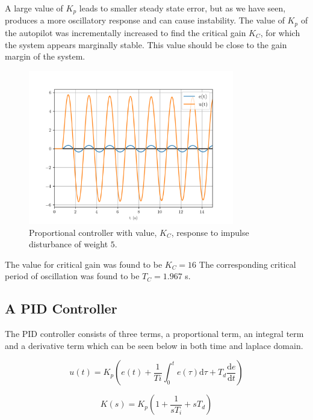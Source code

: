 \documentclass[8pt]{article}
\begin{document}
A large value of $K_p$ leads to smaller steady state error, but as we have seen, produces a more oscillatory response and can cause instability.
The value of $K_p$ of the autopilot was incrementally increased to find the critical gain $K_C$, for which the system appears marginally stable. This value should be close to the gain margin of the system.

\begin{figure}[H]
    \centering
    \includegraphics[width=0.8\textwidth]{figures/FIGURE_12.png}
    \caption{Proportional controller with value, $K_C$, response to impulse disturbance of weight $5$.}
    \label{fig:figure12}
\end{figure}

The value for critical gain was found to be $K_C = 16$
The corresponding critical period of oscillation was found to be $T_C = 1.967$ s.

\subsection{A PID Controller}

The PID controller consists of three terms, a proportional term, an integral term and a derivative term which can be seen below in both time and laplace domain.

\begin{equation}
    u(t) = K_p \left ( e(t) + \frac{1}{Ti}\int_{0}^{t}e(\tau)\mathrm{d}\tau + T_d\frac{\mathrm{d} e}{\mathrm{d} t} \right )
\end{equation}

\begin{equation}
    K(s) = K_p \left( 1 + \frac{1}{sT_i} + sT_d \right)
\end{equation}
\end{document}
